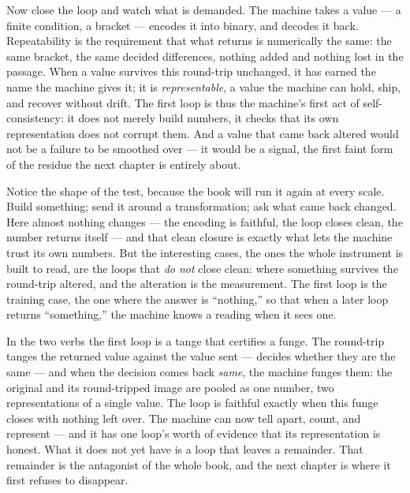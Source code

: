 Now close the loop and watch what is demanded. The machine takes a value --- a finite condition, a bracket --- encodes
it into binary, and decodes it back. Repeatability is the requirement that what returns is numerically the same: the
same bracket, the same decided differences, nothing added and nothing lost in the passage. When a value survives this
round-trip unchanged, it has earned the name the machine gives it; it is \emph{representable}, a value the machine can
hold, ship, and recover without drift. The first loop is thus the machine's first act of self-consistency: it does not
merely build numbers, it checks that its own representation does not corrupt them. And a value that came back altered
would not be a failure to be smoothed over --- it would be a signal, the first faint form of the residue the next
chapter is entirely about.

Notice the shape of the test, because the book will run it again at every scale. Build something; send it around a
transformation; ask what came back changed. Here almost nothing changes --- the encoding is faithful, the loop closes
clean, the number returns itself --- and that clean closure is exactly what lets the machine trust its own numbers. But
the interesting cases, the ones the whole instrument is built to read, are the loops that \emph{do not} close clean:
where something survives the round-trip altered, and the alteration is the measurement. The first loop is the training
case, the one where the answer is ``nothing,'' so that when a later loop returns ``something,'' the machine knows a
reading when it sees one.

In the two verbs the first loop is a tange that certifies a funge. The round-trip tanges the returned value against the
value sent --- decides whether they are the same --- and when the decision comes back \emph{same}, the machine funges
them: the original and its round-tripped image are pooled as one number, two representations of a single value. The
loop is faithful exactly when this funge closes with nothing left over. The machine can now tell apart, count, and
represent --- and it has one loop's worth of evidence that its representation is honest. What it does not yet have is a
loop that leaves a remainder. That remainder is the antagonist of the whole book, and the next chapter is where it
first refuses to disappear.
